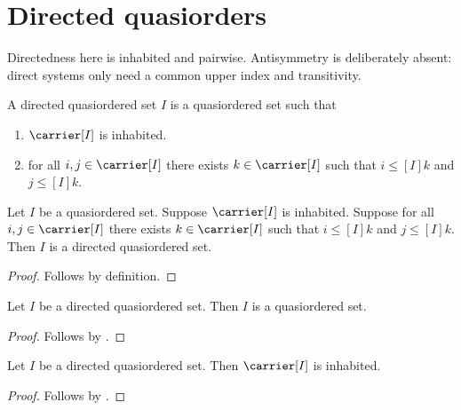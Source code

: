 


\section{Directed quasiorders}

Directedness here is inhabited and pairwise.  Antisymmetry is deliberately
absent: direct systems only need a common upper index and transitivity.

\begin{struct}\label{directed_quasiordered_set}
    A directed quasiordered set $I$ is a quasiordered set such that
    \begin{enumerate}
        \item\label{directed_quasiorder_inhabited}
            $\carrier[I]$ is inhabited.
        \item\label{directed_quasiorder_upper_bound}
            for all $i,j\in\carrier[I]$ there exists $k\in\carrier[I]$
            such that $i\mathrel{\leq[I]}k$ and
                $j\mathrel{\leq[I]}k$.
    \end{enumerate}
\end{struct}

\begin{proposition}\label{directed_quasiordered_set_intro}
    Let $I$ be a quasiordered set.
    Suppose $\carrier[I]$ is inhabited.
    Suppose for all $i,j\in\carrier[I]$ there exists $k\in\carrier[I]$
        such that $i\mathrel{\leq[I]}k$ and $j\mathrel{\leq[I]}k$.
    Then $I$ is a directed quasiordered set.
\end{proposition}
\begin{proof}
    Follows by definition.
\end{proof}

\begin{proposition}\label{directed_quasiordered_set_is_quasiordered}
    Let $I$ be a directed quasiordered set.
    Then $I$ is a quasiordered set.
\end{proposition}
\begin{proof}
    Follows by .
\end{proof}

\begin{proposition}\label{directed_quasiordered_set_carrier_inhabited}
    Let $I$ be a directed quasiordered set.
    Then $\carrier[I]$ is inhabited.
\end{proposition}
\begin{proof}
    Follows by .
\end{proof}

